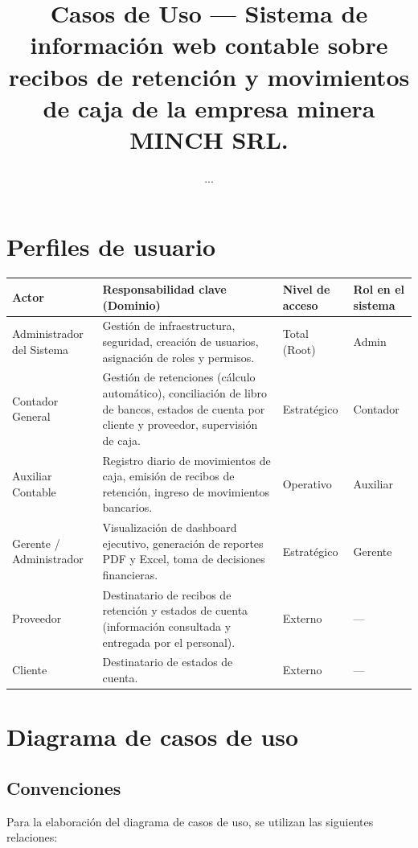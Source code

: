 \documentclass[stu]{apa7}
\title{Casos de Uso --- Sistema de información web contable sobre recibos de retención y movimientos de caja de la empresa minera MINCH SRL.}
\author{...}
\affiliation{...}
\begin{document}
\maketitle

\section{Perfiles de usuario}

\begin{longtable}{|L{3.5cm}|L{6cm}|L{3cm}|L{3cm}|}
\hline
{}
\textbf{Actor} & \textbf{Responsabilidad clave (Dominio)} & \textbf{Nivel de acceso} & \textbf{Rol en el sistema} \\
\hline
\endhead
Administrador del Sistema & Gestión de infraestructura, seguridad, creación de usuarios, asignación de roles y permisos. & Total (Root) & Admin \\
\hline
Contador General & Gestión de retenciones (cálculo automático), conciliación de libro de bancos, estados de cuenta por cliente y proveedor, supervisión de caja. & Estratégico & Contador \\
\hline
Auxiliar Contable & Registro diario de movimientos de caja, emisión de recibos de retención, ingreso de movimientos bancarios. & Operativo & Auxiliar \\
\hline
Gerente / Administrador & Visualización de dashboard ejecutivo, generación de reportes PDF y Excel, toma de decisiones financieras. & Estratégico & Gerente \\
\hline
Proveedor & Destinatario de recibos de retención y estados de cuenta (información consultada y entregada por el personal). & Externo & --- \\
\hline
Cliente & Destinatario de estados de cuenta. & Externo & --- \\
\hline
\end{longtable}

\newpage

\section{Diagrama de casos de uso}

\subsection{Convenciones}

Para la elaboración del diagrama de casos de uso, se utilizan las siguientes relaciones:
\end{document}

